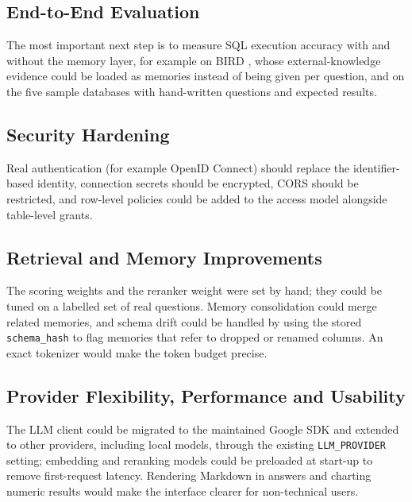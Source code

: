 \subsection{End-to-End Evaluation}
The most important next step is to measure SQL execution accuracy with and without the
memory layer, for example on BIRD \cite{li2023bird}, whose external-knowledge evidence could
be loaded as memories instead of being given per question, and on the five sample
databases with hand-written questions and expected results.

\subsection{Security Hardening}
Real authentication (for example OpenID Connect) should replace the identifier-based
identity, connection secrets should be encrypted, CORS should be restricted, and
row-level policies could be added to the access model alongside table-level grants.

\subsection{Retrieval and Memory Improvements}
The scoring weights and the reranker weight were set by hand; they could be tuned on a
labelled set of real questions. Memory consolidation could merge related memories, and
schema drift could be handled by using the stored \texttt{schema\_hash} to flag memories that
refer to dropped or renamed columns. An exact tokenizer would make the token budget precise.

\subsection{Provider Flexibility, Performance and Usability}
The LLM client could be migrated to the maintained Google SDK and extended to other
providers, including local models, through the existing \texttt{LLM\_PROVIDER} setting;
embedding and reranking models could be preloaded at start-up to remove first-request
latency. Rendering Markdown in answers and charting numeric results would make the
interface clearer for non-technical users.
